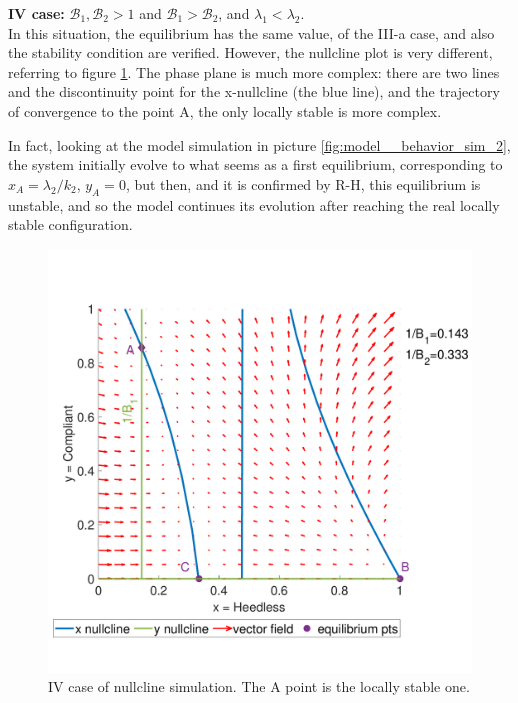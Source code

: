 \textbf{IV case: } $\mathcal{B}_1, \mathcal{B}_2 >1$ and $\mathcal{B}_1 >  \mathcal{B}_2$, and $\lambda_1 < \lambda_2$. \\
In this situation, the equilibrium has the same value, of the III-a case, and also the stability condition are verified. However, the nullcline plot is very different, referring to figure \ref{fig:prnullclineb1_mag_b2_lambda}. The phase plane is much more complex: there are two lines and the discontinuity point for the x-nullcline (the blue line), and the trajectory of convergence to the point A, the only locally stable is more complex.  

In fact, looking at the model simulation in picture \ref{fig:model__behavior_sim_2}, the system initially evolve to what seems as a first equilibrium, corresponding to $x_A = \lambda_2/k_2$, $y_A = 0$, but then, and it is confirmed by R-H, this equilibrium is unstable, and so the model continues its evolution after reaching the real locally stable configuration. 
\begin{figure}[h]
	\centering
	\includegraphics[width=0.48\linewidth]{1_corpo/figure/behavioural_equilibrium/Pr_nullcline_B1_mag_B2_lambda2_mag}
	\caption[Nullcline fourth case]{IV case of nullcline simulation. The A point is the locally stable one.}
	\label{fig:prnullclineb1_mag_b2_lambda}
\end{figure}

